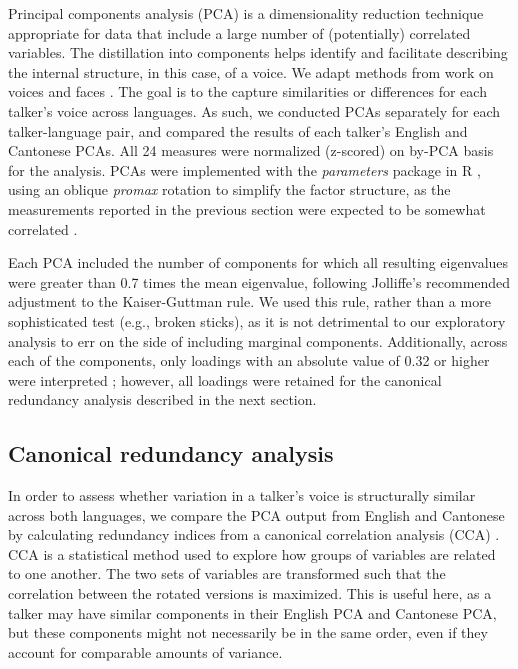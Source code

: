 Principal components analysis (PCA) is a dimensionality reduction technique appropriate for data that include a large number of (potentially) correlated variables. The distillation into components helps identify and facilitate describing the internal structure, in this case, of a voice. We adapt methods from work on voices \citep{lee_2019_acoustic-paper} and faces \citep{burton_2016_faces,turk_1991_eigenfaces}. The goal is to the capture similarities or differences for each talker's voice across languages. As such, we conducted PCAs separately for each talker-language pair, and compared the results of each talker's English and Cantonese PCAs. All 24 measures were normalized (z-scored) on by-PCA basis for the analysis. PCAs were implemented with the \textit{parameters} package \citep{makowski_2019_parameters} in R \citep{r_2021}, using an oblique \textit{promax} rotation to simplify the factor structure, as the measurements reported in the previous section were expected to be somewhat correlated \citep{lee_2019_acoustic-paper}.

Each PCA included the number of components for which all resulting eigenvalues were greater than 0.7 times the mean eigenvalue, following Jolliffe's \citep{jolliffe_2002_pca} recommended adjustment to the Kaiser-Guttman rule. We used this rule, rather than a more sophisticated test (e.g., broken sticks), as it is not detrimental to our exploratory analysis to err on the side of including marginal components. Additionally, across each of the components, only loadings with an absolute value of 0.32 or higher were interpreted \citep{lee_2019_acoustic-paper,tabachnick_2013_statistics}; however, all loadings were retained for the canonical redundancy analysis described in the next section.

\subsection{Canonical redundancy analysis}

In order to assess whether variation in a talker's voice is structurally similar across both languages, we compare the PCA output from English and Cantonese by calculating redundancy indices from a canonical correlation analysis (CCA) \citep{stewart_1968_canonical,jolliffe_2002_pca}. CCA is a statistical method used to explore how groups of variables are related to one another. The two sets of variables are transformed such that the correlation between the rotated versions is maximized. This is useful here, as a talker may have similar components in their English PCA and Cantonese PCA, but these components might not necessarily be in the same order, even if they account for comparable amounts of variance. 

